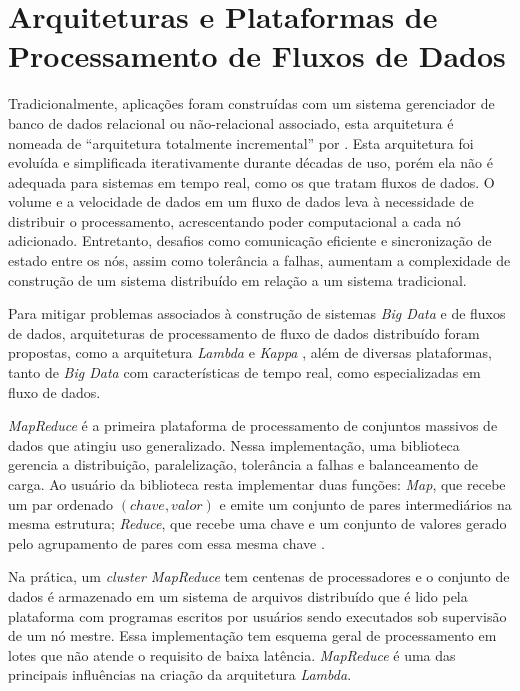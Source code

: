\section{Arquiteturas e Plataformas de Processamento de Fluxos de Dados}
\label{sec:frameworks}


Tradicionalmente, aplicações foram construídas com um sistema gerenciador de
banco de dados relacional ou não-relacional associado, esta arquitetura é
nomeada de ``arquitetura totalmente incremental'' por .
Esta arquitetura foi evoluída e simplificada iterativamente durante décadas de
uso, porém ela não é adequada para sistemas em tempo real, como os que tratam
fluxos de dados.
O volume e a velocidade de dados em um fluxo de dados leva à necessidade de
distribuir o processamento, acrescentando poder computacional a cada nó
adicionado.
Entretanto, desafios como comunicação eficiente e sincronização de estado
entre os nós, assim como tolerância a falhas, aumentam a complexidade de
construção de um sistema distribuído em relação a um sistema tradicional.

\newcommand{\lambdaa}{\xspace\emph{Lambda}\xspace}
\newcommand{\kappaa}{\xspace\emph{Kappa}\xspace}

Para mitigar problemas associados à construção de sistemas \emph{Big Data} e de
fluxos de dados, arquiteturas de processamento de fluxo de dados distribuído
foram propostas, como a arquitetura \lambdaa \cite{marz2015big} e \kappaa
\cite{Kreps2014}, além de diversas plataformas, tanto de \emph{Big Data} com
características de tempo real, como especializadas em fluxo de dados.

\emph{MapReduce} é a primeira plataforma de processamento de conjuntos massivos
de dados que atingiu uso generalizado.
Nessa implementação, uma biblioteca gerencia a distribuição, paralelização,
tolerância a falhas e balanceamento de carga.
Ao usuário da biblioteca resta implementar duas funções:
\emph{Map}, que recebe um par ordenado
$(chave, valor)$ e emite um conjunto de pares intermediários na mesma estrutura;
\emph{Reduce}, que recebe uma chave e um conjunto de valores gerado pelo agrupamento
de pares com essa mesma chave \cite{Dean2004}.

Na prática, um \emph{cluster MapReduce} tem centenas de processadores e o
conjunto de dados é armazenado em um sistema de arquivos distribuído que é lido
pela plataforma com programas escritos por usuários sendo executados sob
supervisão de um nó mestre.
Essa implementação tem esquema geral de processamento em lotes que não atende o
requisito de baixa latência.
\emph{MapReduce} é uma das principais influências na criação da
arquitetura \lambdaa \cite{marz2015big}.

